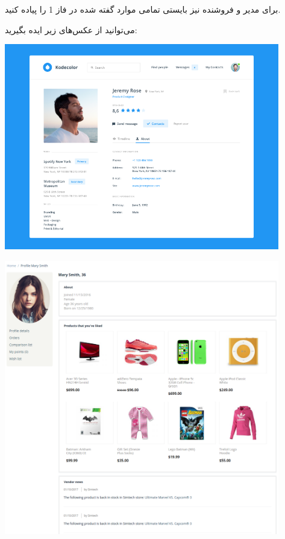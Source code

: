 \documentclass[]{article}
\begin{document}
برای مدیر و فروشنده نیز بایستی تمامی موارد گفته شده در فاز 1 را پیاده کنید.


می‌توانید از عکس‌های زیر ایده بگیرید:


\begin{center}
\includegraphics[width=0.9\textwidth]{images/image13.png}
\end{center}


\begin{center}
\includegraphics[width=0.9\textwidth]{images/image14.png}
\end{center}
\end{document}
